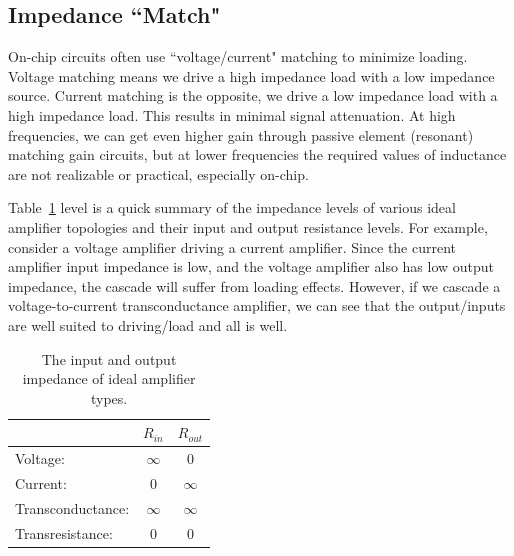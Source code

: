 
\subsection{Impedance ``Match"}


On-chip circuits often use ``voltage/current" matching to minimize loading.  Voltage matching means we drive a high impedance load with a low impedance source.  Current matching is the opposite, we drive a low impedance load with a high impedance load.  This results in minimal signal attenuation.  At high frequencies, we can get even higher gain through passive element (resonant) matching gain circuits, but at lower frequencies the required values of inductance are not realizable or practical, especially on-chip.
 
Table~\ref{tab:imp} level is a quick summary of the impedance levels of various ideal amplifier topologies and their input and output resistance levels.   For example, consider a voltage amplifier driving a current amplifier.  Since the current amplifier input impedance is low, and the voltage amplifier also has low output impedance, the cascade will suffer from loading effects.  However, if we cascade a voltage-to-current transconductance amplifier, we can see that the output/inputs are well suited to driving/load and all is well.
 
 
\begin{table}[tb]
\begin{center}
\begin{tabular}{| l | c| c |}
\hline
  &  $R_{in}$ &  $R_{out}$ \\
  \hline
 Voltage: & $\infty$ &  $0$ \\
 Current: & $0$  &  $\infty$ \\
 Transconductance: & $\infty$ &  $\infty$ \\
 Transresistance: & $0$ &  $0$ \\
\hline
\end{tabular}
\end{center}
\caption{The input and output impedance of ideal amplifier types. \label{tab:imp}} 
\end{table}



\section{\topicB}



